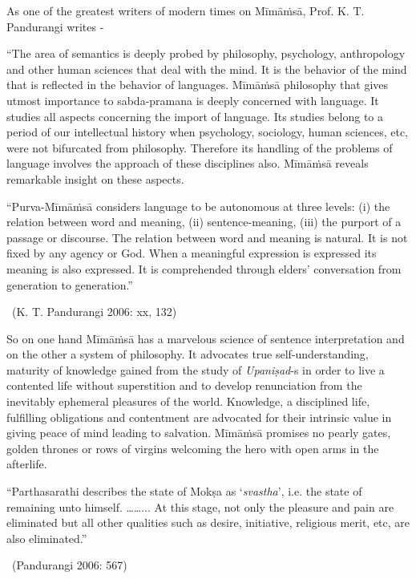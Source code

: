 As one of the greatest writers of modern times on Mīmāṁsā, Prof. K. T. Pandurangi writes -

\begin{myquote}
“The area of semantics is deeply probed by philosophy, psychology, anthropology and other human sciences that deal with the mind. It is the behavior of the mind that is reflected in the behavior of languages. Mīmāṁsā philosophy that gives utmost importance to sabda-pramana is deeply concerned with language. It studies all aspects concerning the import of language. Its studies belong to a period of our intellectual history when psychology, sociology, human sciences, etc, were not bifurcated from philosophy. Therefore its handling of the problems of language involves the approach of these disciplines also. Mīmāṁsā reveals remarkable insight on these aspects.
\end{myquote}

\begin{myquote}
“Purva-Mīmāṁsā considers language to be autonomous at three levels: (i) the relation between word and meaning, (ii) sentence-meaning, (iii) the purport of a passage or discourse. The relation between word and meaning is natural. It is not fixed by any agency or God. When a meaningful expression is expressed its meaning is also expressed. It is comprehended through elders’ conversation from generation to generation.” 

~\hfill (K. T. Pandurangi 2006: xx, 132)
\end{myquote}

So on one hand Mīmāṁsā has a marvelous science of sentence interpretation and on the other a system of philosophy. It advocates true self-understanding, maturity of knowledge gained from the study of \textit{Upaniṣad}-s in order to live a contented life without superstition and to develop renunciation from the inevitably ephemeral pleasures of the world. Knowledge, a disciplined life, fulfilling obligations and contentment are advocated for their intrinsic value in giving peace of mind leading to salvation. Mīmāṁsā promises no pearly gates, golden thrones or rows of virgins welcoming the hero with open arms in the afterlife.

\begin{myquote}
“Parthasarathi describes the state of Mokṣa as ‘\textit{svastha}’, i.e. the state of remaining unto himself. ……... At this stage, not only the pleasure and pain are eliminated but all other qualities such as desire, initiative, religious merit, etc, are also eliminated.” 

~\hfill (Pandurangi 2006: 567)
\end{myquote}

